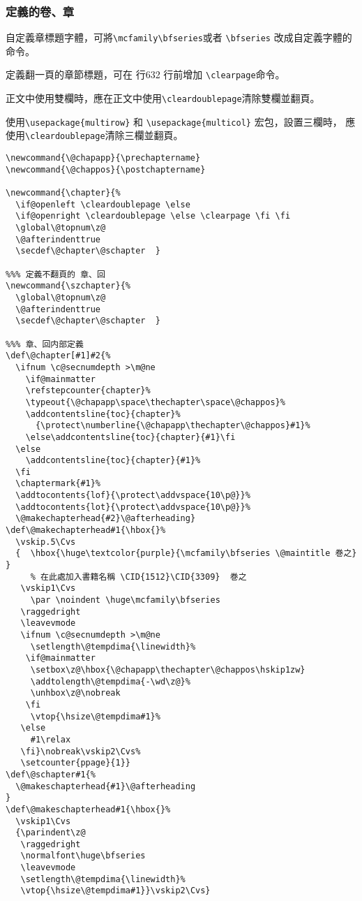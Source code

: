 \subsubsection{定義的卷、章}

\par 自定義章標題字體，可將\verb+\mcfamily\bfseries+或者 \verb+\bfseries+
改成自定義字體的命令。
\par 定義翻一頁的章節標題，可在 行632 行前增加 \verb+\clearpage+命令。
\par 正文中使用雙欄時，應在正文中使用\verb+\cleardoublepage+清除雙欄並翻頁。
\par 使用\verb+\usepackage{multirow}+ 和 \verb+\usepackage{multicol}+ 宏包，設置三欄時，
應使用\verb+\cleardoublepage+清除三欄並翻頁。
\begin{lstlisting}[firstnumber=642]
\newcommand{\@chapapp}{\prechaptername}
\newcommand{\@chappos}{\postchaptername}

\newcommand{\chapter}{%
  \if@openleft \cleardoublepage \else
  \if@openright \cleardoublepage \else \clearpage \fi \fi
  \global\@topnum\z@
  \@afterindenttrue
  \secdef\@chapter\@schapter  }

%%% 定義不翻頁的 章、回
\newcommand{\szchapter}{%
  \global\@topnum\z@
  \@afterindenttrue
  \secdef\@chapter\@schapter  }

%%% 章、回内部定義
\def\@chapter[#1]#2{%
  \ifnum \c@secnumdepth >\m@ne
    \if@mainmatter
    \refstepcounter{chapter}%
    \typeout{\@chapapp\space\thechapter\space\@chappos}%
    \addcontentsline{toc}{chapter}%
      {\protect\numberline{\@chapapp\thechapter\@chappos}#1}%
    \else\addcontentsline{toc}{chapter}{#1}\fi
  \else
    \addcontentsline{toc}{chapter}{#1}%
  \fi
  \chaptermark{#1}%
  \addtocontents{lof}{\protect\addvspace{10\p@}}%
  \addtocontents{lot}{\protect\addvspace{10\p@}}%
  \@makechapterhead{#2}\@afterheading}
\def\@makechapterhead#1{\hbox{}%
  \vskip.5\Cvs
  {  \hbox{\huge\textcolor{purple}{\mcfamily\bfseries \@maintitle 巻之} }
  	 % 在此處加入書籍名稱 \CID{1512}\CID{3309}  巻之
   \vskip1\Cvs
     \par \noindent \huge\mcfamily\bfseries
   \raggedright
   \leavevmode
   \ifnum \c@secnumdepth >\m@ne
     \setlength\@tempdima{\linewidth}%
    \if@mainmatter
     \setbox\z@\hbox{\@chapapp\thechapter\@chappos\hskip1zw}
     \addtolength\@tempdima{-\wd\z@}%
     \unhbox\z@\nobreak
    \fi
     \vtop{\hsize\@tempdima#1}%
   \else
     #1\relax
   \fi}\nobreak\vskip2\Cvs%
   \setcounter{ppage}{1}}
\def\@schapter#1{%
  \@makeschapterhead{#1}\@afterheading
}
\def\@makeschapterhead#1{\hbox{}%
  \vskip1\Cvs
  {\parindent\z@
   \raggedright
   \normalfont\huge\bfseries
   \leavevmode
   \setlength\@tempdima{\linewidth}%
   \vtop{\hsize\@tempdima#1}}\vskip2\Cvs}
\end{lstlisting}


